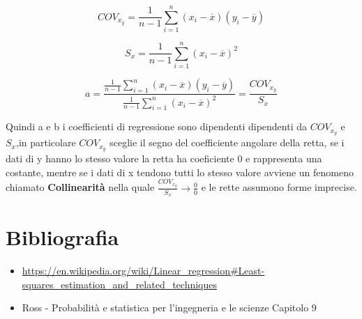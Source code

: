 \documentclass{article}
\begin{document}
\[
    COV_x_y = \frac{1}{n-1}\sum_{i=1}^{n}(x_i - \overline{x})(y_i - \overline{y})
\]

\[
    S_x=\frac{1}{n-1}\sum_{i=1}^{n}(x_i - \overline{x})^2
\]

\[
    a=\frac{\frac{1}{n-1}\sum_{i=1}^{n}(x_i - \overline{x})(y_i - \overline{y})}{\frac{1}{n-1}\sum_{i=1}^{n}(x_i - \overline{x})^2}=\frac{COV_x_y}{S_x}
\]

Quindi a e b i coefficienti di regressione sono dipendenti dipendenti da $COV_x_y$ e $S_x$,in particolare $COV_x_y$ sceglie il segno del coefficiente angolare della retta, se i dati di y hanno lo stesso valore la retta ha coeficiente 0 e rappresenta una costante, mentre se i dati di x tendono tutti lo stesso valore avviene un fenomeno chiamato \textbf{Collinearità} nella quale $\frac{COV_x_y}{S_x}\longrightarrow\frac{0}{0}$  e le rette assumono forme imprecise.


\section{Bibliografia}

\begin{itemize}
    \item \href{https://en.wikipedia.org/wiki/Linear_regression#Least-squares_estimation_and_related_techniques}{https://en.wikipedia.org/wiki/Linear_regression#Least-squares_estimation_and_related_techniques}
    \item Ross - Probabilità e statistica per l'ingegneria e le scienze Capitolo 9
    
\end{itemize}
\end{document}
